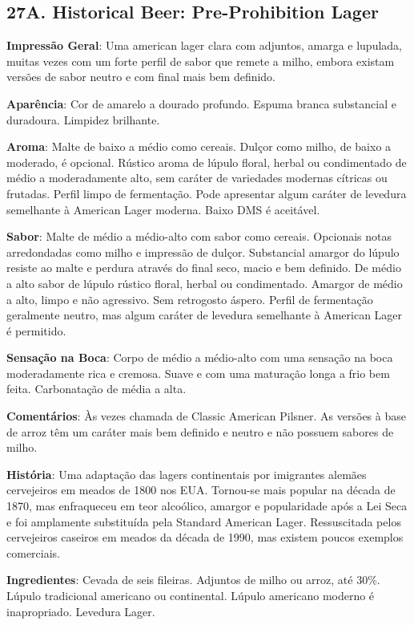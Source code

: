 \subsection*{27A. Historical Beer: Pre-Prohibition Lager}
\textbf{Impressão Geral}: Uma american lager clara com adjuntos, amarga e lupulada, muitas vezes com um forte perfil de sabor que remete a milho, embora existam versões de sabor neutro e com final mais bem definido.

\textbf{Aparência}: Cor de amarelo a dourado profundo. Espuma branca substancial e duradoura. Limpidez brilhante.

\textbf{Aroma}: Malte de baixo a médio como cereais. Dulçor como milho, de baixo a moderado, é opcional. Rústico aroma de lúpulo floral, herbal ou condimentado de médio a moderadamente alto, sem caráter de variedades modernas cítricas ou frutadas. Perfil limpo de fermentação. Pode apresentar algum caráter de levedura semelhante à American Lager moderna. Baixo DMS é aceitável.

\textbf{Sabor}: Malte de médio a médio-alto com sabor como cereais. Opcionais notas arredondadas como milho e impressão de dulçor. Substancial amargor do lúpulo resiste ao malte e perdura através do final seco, macio e bem definido. De médio a alto sabor de lúpulo rústico floral, herbal ou condimentado. Amargor de médio a alto, limpo e não agressivo. Sem retrogosto áspero. Perfil de fermentação geralmente neutro, mas algum caráter de levedura semelhante à American Lager é permitido.

\textbf{Sensação na Boca}: Corpo de médio a médio-alto com uma sensação na boca moderadamente rica e cremosa. Suave e com uma maturação longa a frio bem feita. Carbonatação de média a alta.

\textbf{Comentários}: Às vezes chamada de Classic American Pilsner. As versões à base de arroz têm um caráter mais bem definido e neutro e não possuem sabores de milho.

\textbf{História}: Uma adaptação das lagers continentais por imigrantes alemães cervejeiros em meados de 1800 nos EUA. Tornou-se mais popular na década de 1870, mas enfraqueceu em teor alcoólico, amargor e popularidade após a Lei Seca e foi amplamente substituída pela Standard American Lager. Ressuscitada pelos cervejeiros caseiros em meados da década de 1990, mas existem poucos exemplos comerciais.

\textbf{Ingredientes}: Cevada de seis fileiras. Adjuntos de milho ou arroz, até 30\%. Lúpulo tradicional americano ou continental. Lúpulo americano moderno é inapropriado. Levedura Lager.

